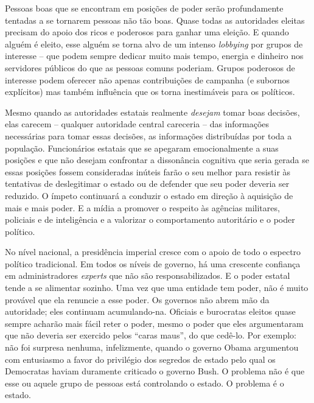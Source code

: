 Pessoas boas que se encontram em posições de poder serão profundamente tentadas a se tornarem pessoas não tão boas. Quase todas as autoridades eleitas precisam do apoio dos ricos e poderosos para ganhar uma eleição. E quando alguém é eleito, esse alguém se torna alvo de um intenso \emph{lobbying} por grupos de interesse -- que podem sempre dedicar muito mais tempo, energia e dinheiro nos servidores públicos do que as pessoas comuns poderiam. Grupos poderosos de interesse podem oferecer não apenas contribuições de campanha (e subornos explícitos) mas também influência que os torna inestimáveis para os políticos.

Mesmo quando as autoridades estatais realmente \emph{desejam} tomar boas decisões, elas carecem -- qualquer autoridade central careceria -- das informações necessárias para tomar essas decisões, as informações distribuídas por toda a população. Funcionários estatais que se apegaram emocionalmente a suas posições e que não desejam confrontar a dissonância cognitiva que seria gerada se essas posições fossem consideradas inúteis farão o seu melhor para resistir às tentativas de deslegitimar o estado ou de defender que seu poder deveria ser reduzido. O ímpeto continuará a conduzir o estado em direção à aquisição de mais e mais poder. E a mídia a promover o respeito às agências militares, policiais e de inteligência e a valorizar o comportamento autoritário e o poder político.

No nível nacional, a presidência imperial cresce com o apoio de todo o espectro político tradicional. Em todos os níveis de governo, há uma crescente confiança em administradores \emph{experts} que não são responsabilizados. E o poder estatal tende a se alimentar sozinho. Uma vez que uma entidade tem poder, não é muito provável que ela renuncie a esse poder. Os governos não abrem mão da autoridade; eles continuam acumulando-na. Oficiais e burocratas eleitos quase sempre acharão mais fácil reter o poder, mesmo o poder que eles argumentaram que não deveria ser exercido pelos ``caras maus'', do que cedê-lo. Por exemplo: não foi surpresa nenhuma, infelizmente, quando o governo Obama argumentou com entusiasmo a favor do privilégio dos segredos de estado pelo qual os Democratas haviam duramente criticado o governo Bush. O problema não é que esse ou aquele grupo de pessoas está controlando o estado. O problema é o estado.

